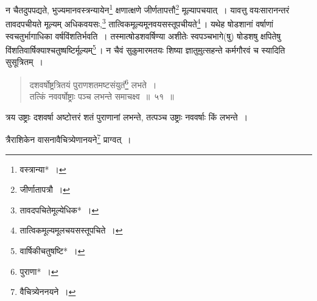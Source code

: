 \documentclass[10pt, openany]{book}
\begin{document}
{{
{न चैतदुपपद्यते, भुज्यमानवस्त्रन्यायेन\renewcommand{\thefootnote}{\s १}\footnote{\s *वस्त्रान्या*~।}  क्षणात्क्षणे
जीर्णतापत्तौ\renewcommand{\thefootnote}{\s २}\footnote{\s जीर्णातापत्रौ~।} मूल्यापचयात्~। यावत्तु वयःसारानन्तरं तावदपचीयते मूल्यम् अधिकवयसः,\renewcommand{\thefootnote}{\s ३}\footnote{\s तावदपचितेमूल्येधिक*~।}
तात्विकमूल्यमूनवयसस्तूपचीयते\renewcommand{\thefootnote}{\s ४}\footnote{\s तात्विकमूल्यमूलचयसस्तूपचिते~।}\,। यथेह षोडशानां}
{वर्षाणां स्वचतुर्भागाधिका वर्षविंशतिर्भवति~। तस्मात्षोडशवर्षिण्या
अशीतेः स्वपञ्चभागे(षु)}
{षोडशषु क्षपितेषु विंशतिवार्षिक्याश्चतुष्षष्टिर्मूल्यम्\renewcommand{\thefootnote}{\s ५}\footnote{\s *वार्षिकीचतुषष्टि*~।}\,। न चैवं
सुकुमारमतयः शिष्या}
{ज्ञातुमुत्सहन्ते कर्मगौरवं च स्यादिति सुसूत्रितम्~।} 

\vspace{0.3cm}{उदाहरणम्\textemdash}

\begin{quote}
    
 {\eg दशवर्षोष्ट्रत्रितयं पुराणशतमष्टसंयुतं\renewcommand{\thefootnote}{\s ६}\footnote{\s पुराणा*~।} लभते~। \\
 तत्किं नववर्षोष्ट्राः पञ्च लभन्ते समाचक्ष्व~॥~५१~॥} \end{quote}

{त्रय उष्ट्राः दशवर्षा अष्टोत्तरं शतं पुराणानां लभन्ते, तत्पञ्च
उष्ट्राः नववर्षाः किं}
{लभन्ते~।}

{त्रैराशिकेन वासनावैचित्र्येणानयने\renewcommand{\thefootnote}{\s १०}\footnote{\s *वैचित्र्येननयने~।} प्राग्वत्~।}
\vspace{2mm}

}}
\end{document}
